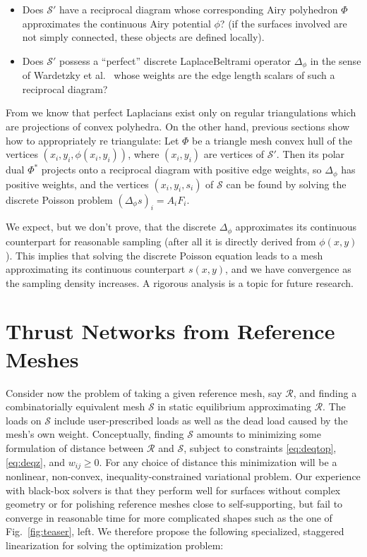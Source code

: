 \documentclass[review]{acmsiggraph}
\def\SS{{\mathcal S}}
\def\RR{{\mathcal R}}
\begin{document}
\begin{itemize}\itemsep-\parsep

\item Does $\SS'$ have a reciprocal diagram whose corresponding Airy
polyhedron $\Phi$ approximates the continuous Airy potential $\phi$? (if
the surfaces involved are not simply connected, these objects are defined
locally).

\item Does $\SS'$ possess a ``perfect'' discrete Laplace\dash Beltrami
operator $\Delta_\phi$ in the sense of Wardetzky et
al.~ whose weights are the edge length scalars of
such a reciprocal diagram?

\end{itemize}

From \cite{wardetzky07} we know that perfect Laplacians exist only on
regular triangulations which are projections of convex polyhedra. On the
other hand, previous sections show how to appropriately re\dash
triangulate: Let $\Phi$ be a triangle mesh convex hull of the vertices
$(x_i,y_i,\phi(x_i,y_i))$, where $(x_i,y_i)$ are vertices of $\SS'$. Then
its polar dual $\Phi^*$ projects onto a reciprocal diagram with positive
edge weights, so $\Delta_\phi$ has positive weights, and the vertices
$(x_i,y_i,s_i)$ of $\SS$ can be found by solving the discrete Poisson
problem $(\Delta_\phi s)_i=A_iF_i$.

We expect, but we don't prove, that the
discrete $\Delta_\phi$
approximates its continuous counterpart for reasonable
sampling (after all it is directly derived from $\phi(x,y)$).
This implies that solving the discrete Poisson equation leads to a mesh
approximating its continuous counterpart $s(x,y)$, and we have
convergence as the sampling density increases.
A rigorous analysis is a  topic for future research.





\section{Thrust Networks from Reference Meshes} \label{sec:opt}

Consider now the problem of taking a given reference mesh, say $\RR$, and
finding a combinatorially equivalent mesh $\SS$ in static equilibrium
approximating $\RR$. The loads on $\SS$ include user-prescribed loads as
well as the dead load caused by the mesh's own weight. Conceptually,
finding $\SS$ amounts to minimizing some formulation of distance between
$\RR$ and $\SS$, subject to constraints \eqref{eq:deqtop},
\eqref{eq:deqz}, and $w_{ij} \geq 0$. For any choice of distance this
minimization will be a nonlinear, non-convex, inequality-constrained
variational problem. Our experience with black-box solvers 
\cite{ipopt} is that
they perform well for surfaces without complex geometry or for
polishing reference meshes close to self-supporting, but fail to converge
in reasonable time for more complicated shapes such as the one of
Fig.~\ref{fig:teaser}, left.
We therefore propose the following specialized, staggered linearization for solving the optimization problem:
\end{document}
